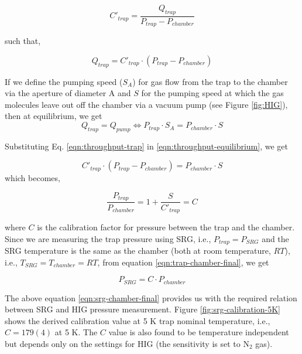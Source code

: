 \[ C'_{trap} = \frac{Q_{trap}}{P_{trap} - P_{chamber}}\]

such that,

\begin{equation}
    Q_{trap} = C'_{trap} \cdot (P_{trap} - P_{chamber})
    \label{eqn:throughput-trap}
\end{equation}

If we define the pumping speed ($S_A$) for gas flow from the trap to the
chamber via the aperture of diameter A and $S$ for the pumping speed at which
the gas molecules leave out off the chamber via a vacuum pump (see Figure
\ref{fig:HIG}), then at equilibrium, we get
\begin{equation}
    Q_{trap} = Q_{pump} \Leftrightarrow P_{trap} \cdot S_A = P_{chamber} \cdot S
    \label{eqn:throughput-equilibrium}
\end{equation}

Substituting Eq. \ref{eqn:throughput-trap} in \ref{eqn:throughput-equilibrium},
we get

\[ C'_{trap} \cdot (P_{trap} - P_{chamber}) = P_{chamber} \cdot S \]
which becomes,

\begin{equation}
    \frac{P_{trap}}{P_{chamber}} = 1 + \frac{S}{C'_{trap}} = C
    \label{eqn:trap-chamber-final}
\end{equation}

where $C$ is the calibration factor for pressure between the trap and the
chamber. \\

Since we are measuring the trap pressure using SRG, i.e., $P_{trap}=P_{SRG}$
and the SRG temperature is the same as the chamber (both at room temperature,
$RT$), i.e., $T_{SRG}=T_{chamber}=RT$, from equation
\ref{eqn:trap-chamber-final}, we get

\begin{equation}
    P_{SRG} = C \cdot P_{chamber}
    \label{eqn:srg-chamber-final}
\end{equation}

The above equation \ref{eqn:srg-chamber-final} provides us with the required
relation between SRG and HIG pressure measurement. Figure
\ref{fig:srg-calibration-5K} shows the derived calibration value at 5 K trap
nominal temperature, i.e., $C=179(4)$ at 5 K. The $C$ value is also found to be
temperature independent but depends only on the settings for HIG (the
sensitivity is set to N$_2$ gas).